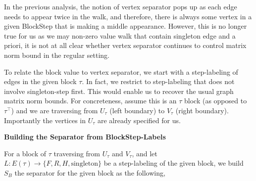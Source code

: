 \documentclass[10pt,a4paper]{article}
\begin{document}
In the previous analysis, the notion of vertex separator pops up as each edge needs to appear twice in the walk, and therefore, there is always some vertex in a given BlockStep that is making a middle appearance. However, this is no longer true for us as we may non-zero value walk that contain singleton edge and a priori, it is not at all clear whether vertex separator continues to control matrix norm bound in the regular setting.\par




To relate the block value to vertex separator, we start with a step-labeling of edges in the given block $\tau$. In fact, we restrict to step-labeling that does not involve singleton-step first. This would enable us to recover the usual graph matrix norm bounds. For concreteness, assume this is an $\tau$ block (as opposed to $\tau^{\top}$) and we are traversing from $U_{\tau}$ (left boundary) to $V_{\tau}$ (right boundary). Importantly the vertices in $U_{\tau}$ are already specified for us.\par




\par\medskip\noindent\textbf{Building the Separator from BlockStep-Labels}\par




For a block of $\tau$ traversing from $U_{\tau}$ and $V_{\tau}$, and let $L:E(\tau)\rightarrow\{F,R,H,\text{singleton}\}$ be a step-labeling of the given block, we build $S_{B}$ the separator for the given block as the following,\par
\end{document}
